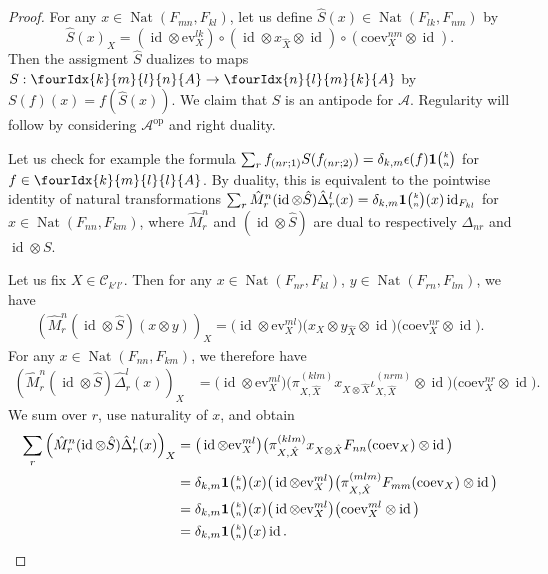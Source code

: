 \documentclass[10pt]{article}
\DeclareMathOperator{\id}{id}
\DeclareMathOperator{\Nat}{\mathrm{Nat}}
\newcommand{\ev}{\mathrm{ev}}
\newcommand{\coev}{\mathrm{coev}}
\newcommand{\Grt}[3]{#1{\tiny {\begin{pmatrix} #2\\#3\end{pmatrix}}}}
\newcommand{\UnitC}[2]{\Grt{\mathbf{1}}{#1}{#2}}
\newcommand{\Gr}[5]{\fourIdx{#2}{#4}{#3}{#5}{#1}}%
\theoremstyle{definition}
\numberwithin{equation}{section}
\begin{document}
\begin{proof} 
  For any $x\in \Nat(F_{mn},F_{kl})$, let us define $\hat{S}(x) \in
  \Nat(F_{lk},F_{nm})$ by \[\hat{S}(x)_X = 
(\id \otimes \ev^{lk}_{X}) \circ (\id \otimes x_{\hat X}
  \otimes \id) \circ (\coev^{nm}_{X} \otimes \id).\]
Then the assigment $\hat{S}$ dualizes to maps $S:\Gr{A}{k}{l}{m}{n} \rightarrow \Gr{A}{n}{m}{l}{k}$ by $S(f)(x) = f(\hat{S}(x))$. We claim that $S$ is an antipode for $\mathscr{A}$. Regularity will follow by considering $\mathscr{A}^{\textrm{op}}$ and right duality.

Let us check for example the formula $\sum_r f_{(nr;1)} S(f_{(nr;2)}) = \delta_{k,m}\epsilon(f)\UnitC{k}{n}$ for $f\in \Gr{A}{k}{l}{m}{l}$. By duality, this is equivalent to the pointwise identity of natural transformations $\sum_r\hat{M}^n_r(\id\otimes \hat{S})\hat{\Delta}^l_r(x) = \delta_{k,m}\UnitC{k}{n}(x) \id_{F_{kl}}$ for $x\in \Nat(F_{nn},F_{km})$, where $\hat{M}^n_r$ and $(\id\otimes \hat{S})$ are dual to respectively $\Delta_{nr}$ and $\id\otimes S$. 

Let us fix $X\in \mathcal{C}_{k'l'}$. Then for any $x\in
\Nat(F_{nr},F_{kl})$, $y\in \Nat(F_{rn},F_{lm})$, we have
\begin{align*}
  \left(\hat{M}^n_r(\id\otimes \hat{S})(x\otimes y)\right)_X =
\big(\id \otimes \ev_{X}^{ml}\big)  \big(x_{X} \otimes y_{\hat X} \otimes \id\big) 
  \big(\coev_{X}^{nr} \otimes \id\big).
\end{align*}
For any $x\in \Nat(F_{nn},F_{km})$, we therefore have
\begin{align*}
  \left(\hat{M}^n_r(\id\otimes \hat{S})\hat\Delta^{l}_{r}(x)\right)_X &=
\big(\id \otimes \ev^{ml}_{X}\big)  \big(\pi^{(klm)}_{X,\hat X}x_{X\otimes \hat
    X}\iota^{(nrm)}_{X,\hat X} \otimes \id\big) 
  \big(\coev^{nr}_{X} \otimes \id\big).
\end{align*}
We sum over $r$, use naturality of $x$, and obtain
\begin{align*}
\sum_{r}    \left(\hat{M}^n_r(\id\otimes
  \hat{S})\hat\Delta^{l}_{r}(x)\right)_X &=
\big(\id \otimes \ev_{X}^{ml}\big) \big(\pi^{(klm)}_{X,\hat X}x_{X\otimes \hat
    X}F_{nn}(\coev_{X}) \otimes \id\big) \\
  &=\delta_{k,m} \UnitC{k}{n}(x)
\big(\id \otimes \ev_{X}^{ml}\big) 
\big(\pi^{(mlm)}_{X,\hat X}F_{mm}(\coev_{X})
  \otimes \id\big) \\
  &=\delta_{k,m} \UnitC{k}{n}(x)
\big(\id \otimes \ev_{X}^{ml}\big) 
\big(\coev^{ml}_{X}
  \otimes \id\big) \\
  &= \delta_{k,m} \UnitC{k}{n}(x) \id.
\end{align*}
\end{proof} 
\end{document}
